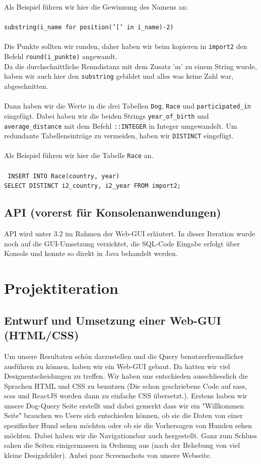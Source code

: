 \documentclass[10pt,a4paper]{article}
\begin{document}
  Als Beispiel führen wir hier die Gewinnung des Namens an:\\ \\
  \texttt{substring(i\_name for position('[' in i\_name)-2)} \\ \\
  Die Punkte sollten wir runden, daher haben wir beim kopieren in \texttt{import2} den Befehl \texttt{round(i\_punkte)} angewandt.\\
  Da die durchschnittliche Renndistanz mit dem Zusatz 'm' zu einem String wurde, haben wir auch hier den \texttt{substring} gebildet und alles was keine Zahl war, abgeschnitten.\\ 
  \\
  Dann haben wir die Werte in die drei Tabellen \texttt{Dog}, \texttt{Race} und \texttt{participated\_in} eingefügt. Dabei haben wir die beiden Strings \texttt{year\_of\_birth} und \texttt{average\_distance} mit dem Befehl \texttt{::INTEGER} in Integer umgewandelt. Um redundante Tabelleneinträge zu vermeiden, haben wir \texttt{DISTINCT} eingefügt.\\  
  \\
  Als Beispiel führen wir hier die Tabelle \texttt{Race} an.\\ \\
  \texttt{  INSERT INTO Race(country, year)\\
  \hspace*{2mm}	SELECT DISTINCT i2\_country, i2\_year FROM import2;}
\subsection{API (vorerst für Konsolenanwendungen)}
API wird unter 3.2 im Rahmen der Web-GUI erläutert. In dieser Iteration wurde noch auf die GUI-Umsetzung verzichtet, die SQL-Code Eingabe erfolgt über Konsole und konnte so direkt in Java behandelt werden.
	\newpage
	\section{Projektiteration}
	\subsection{Entwurf und Umsetzung einer Web-GUI (HTML/CSS)}
	Um unsere Resultaten schön darzustellen und die Query benutzerfreundlicher ausführen zu können, haben wir ein Web-GUI gebaut. Da hatten wir viel Designentscheidungen zu treffen. Wir haben uns entschieden ausschliesslich die Sprachen HTML und CSS zu benutzen (Die schon geschriebene Code auf sass, scss und ReactJS worden dann zu einfache CSS übersetzt.). Erstens haben wir unsere Dog-Query Seite erstellt und dabei gemerkt dass wir ein "Willkommen Seite" brauchen wo Users sich entschieden können, ob sie die Daten von einer spezifischer Hund sehen möchten oder ob sie die Vorhersagen von Hunden sehen möchten.
Dabei haben wir die Navigationsbar auch hergestellt. Ganz zum Schluss sahen die Seiten einigermassen in Ordnung aus (nach der Behebung von viel kleine Designfehler). Anbei paar Screenschots von unsere Webseite. 
\end{document}
